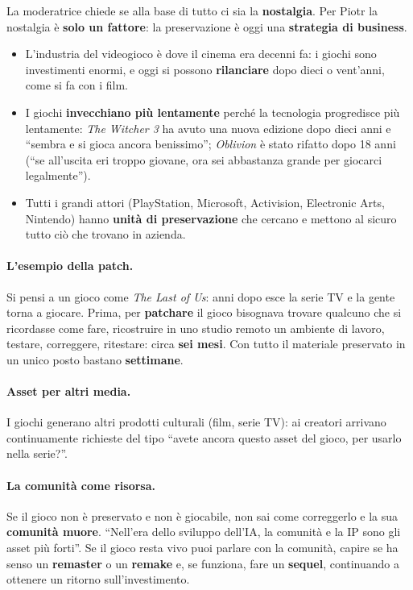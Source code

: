 La moderatrice chiede se alla base di tutto ci sia la \textbf{nostalgia}. Per
Piotr la nostalgia è \textbf{solo un fattore}: la preservazione è oggi una
\textbf{strategia di business}.
\begin{itemize}
  \item L'industria del videogioco è dove il cinema era decenni fa: i giochi sono
        investimenti enormi, e oggi si possono \textbf{rilanciare} dopo dieci o
        vent'anni, come si fa con i film.
  \item I giochi \textbf{invecchiano più lentamente} perché la tecnologia
        progredisce più lentamente: \emph{The Witcher 3} ha avuto una nuova
        edizione dopo dieci anni e ``sembra e si gioca ancora benissimo'';
        \emph{Oblivion} è stato rifatto dopo 18 anni (``se all'uscita eri troppo
        giovane, ora sei abbastanza grande per giocarci legalmente'').
  \item Tutti i grandi attori (PlayStation, Microsoft, Activision, Electronic
        Arts, Nintendo) hanno \textbf{unità di preservazione} che cercano e
        mettono al sicuro tutto ciò che trovano in azienda.
\end{itemize}

\paragraph{L'esempio della patch.} Si pensi a un gioco come \emph{The Last of
Us}: anni dopo esce la serie TV e la gente torna a giocare. Prima, per
\textbf{patchare} il gioco bisognava trovare qualcuno che si ricordasse come
fare, ricostruire in uno studio remoto un ambiente di lavoro, testare,
correggere, ritestare: circa \textbf{sei mesi}. Con tutto il materiale
preservato in un unico posto bastano \textbf{settimane}.

\paragraph{Asset per altri media.} I giochi generano altri prodotti culturali
(film, serie TV): ai creatori arrivano continuamente richieste del tipo ``avete
ancora questo asset del gioco, per usarlo nella serie?''.

\paragraph{La comunità come risorsa.} Se il gioco non è preservato e non è
giocabile, non sai come correggerlo e la sua \textbf{comunità muore}. ``Nell'era
dello sviluppo dell'IA, la comunità e la IP sono gli asset più forti''. Se il
gioco resta vivo puoi parlare con la comunità, capire se ha senso un
\textbf{remaster} o un \textbf{remake} e, se funziona, fare un
\textbf{sequel}, continuando a ottenere un ritorno sull'investimento.


